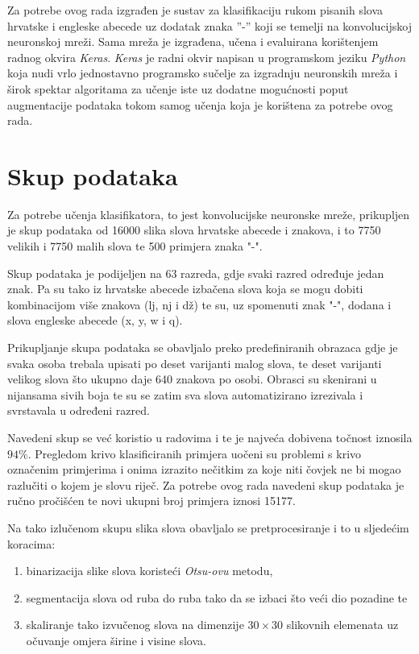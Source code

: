Za potrebe ovog rada izgrađen je sustav za klasifikaciju rukom pisanih slova hrvatske i engleske abecede uz dodatak znaka ''-'' koji se temelji na konvolucijskoj neuronskoj mreži. Sama mreža je izgrađena, učena i evaluirana korištenjem radnog okvira \emph{Keras}. \emph{Keras} je radni okvir napisan u programskom jeziku \emph{Python} koja nudi vrlo jednostavno programsko sučelje za izgradnju neuronskih mreža i širok spektar algoritama za učenje iste uz dodatne mogućnosti poput augmentacije podataka tokom samog učenja koja je korištena za potrebe ovog rada.

\section{Skup podataka}

Za potrebe učenja klasifikatora, to jest konvolucijske neuronske mreže, prikupljen je skup podataka od \num{16000} slika slova hrvatske abecede i znakova, i to \num{7750} velikih i \num{7750} malih slova te \num{500} primjera znaka "-".

Skup podataka je podijeljen na 63 razreda, gdje svaki razred određuje jedan znak. Pa su tako iz hrvatske abecede izbačena slova koja se mogu dobiti kombinacijom više znakova (lj, nj i dž) te su, uz spomenuti znak "-", dodana i slova engleske abecede (x, y, w i q).

Prikupljanje skupa podataka se obavljalo preko predefiniranih obrazaca gdje je svaka osoba trebala upisati po deset varijanti malog slova, te deset varijanti velikog slova što ukupno daje 640 znakova po osobi. Obrasci su skenirani u nijansama sivih boja te su se zatim sva slova automatizirano izrezivala i svrstavala u određeni razred.

Navedeni skup se već koristio u radovima \cite{zavrsni} i \cite{seminar} te je najveća dobivena točnost iznosila $94 \%$. Pregledom krivo klasificiranih primjera uočeni su problemi s krivo označenim primjerima i onima izrazito nečitkim za koje niti čovjek ne bi mogao razlučiti o kojem je slovu riječ. Za potrebe ovog rada navedeni skup podataka je ručno pročišćen te novi ukupni broj primjera iznosi \num{15177}.

Na tako izlučenom skupu slika slova obavljalo se pretprocesiranje i to u sljedećim koracima:

 \begin{enumerate}
   \item binarizacija slike slova koristeći \emph{Otsu-ovu} metodu, 
   \item segmentacija slova od ruba do ruba tako da se izbaci što veći dio pozadine te
   \item skaliranje tako izvučenog slova na dimenzije $30 \times 30$ slikovnih elemenata uz očuvanje omjera širine i visine slova.
 \end{enumerate}

